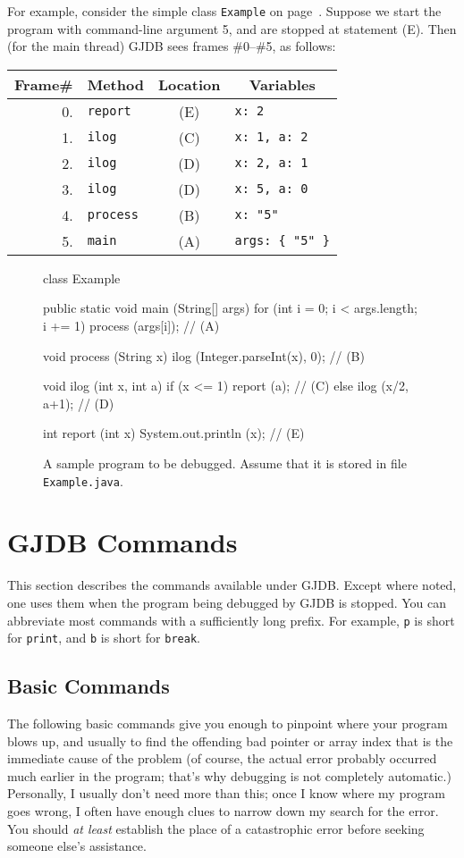 \documentclass[11pt,twoside]{handout}
\begin{document}
For example, consider the simple class {\tt Example} on page~\pageref{fig:Example}.
Suppose we start the program with command-line argument 5, and
are stopped at statement (E).  Then (for the main thread) GJDB
sees frames \#0--\#5, as follows:

\medskip
\begin{tabular}{r | l | c | l}
\multicolumn{1}{c|}{Frame\#} & 
\multicolumn{1}{c|}{Method} & 
Location &
\multicolumn{1}{c}{Variables} \\
\hline
0. & {\tt report} & (E) & {\tt x: 2} \\
1. & {\tt ilog} & (C) & {\tt x: 1, a: 2} \\
2. & {\tt ilog} & (D) & {\tt x: 2, a: 1} \\
3. & {\tt ilog} & (D) & {\tt x: 5, a: 0} \\
4. & {\tt process} & (B) & {\tt x: "5"} \\
5. & {\tt main} & (A) & \verb|args: { "5" }|
\end{tabular}


\begin{figure}[t]
\begin{program}
class Example {
  public static void main (String[] args) {
    for (int i = 0; i < args.length; i += 1)
      process (args[i]);           // (A)
  }

  void process (String x) {
    ilog (Integer.parseInt(x), 0); // (B)
  }

  void ilog (int x, int a) {
    if (x <= 1)
       report (a);	           // (C)
    else
       ilog (x/2, a+1);		   // (D)
  }

  int report (int x) {
    System.out.println (x);        // (E)
  }
}
\end{program}
\caption{A sample program to be debugged.  Assume that it is stored in
    file {\tt Example.java}.}
\label{fig:Example}
\end{figure}

\section{GJDB Commands}\label{sec:commands}
This section describes the commands available under GJDB. Except where
noted, one
uses them when the program being debugged by GJDB is stopped.
You can abbreviate
most commands with a sufficiently long prefix.  For example, {\tt p} is
short for {\tt print}, and {\tt b} is short for {\tt break}.

\subsection{Basic Commands}
The following basic commands give you enough to pinpoint where your
program blows up, and usually to find the offending bad pointer or
array index that is the immediate cause of the problem (of course, the
actual error probably occurred much earlier in the program; that's why
debugging is not completely automatic.)  Personally, I usually don't
need more than this; once I know where my program goes wrong, I often
have enough clues to narrow down my search for the error.  You should
{\it at least\/} establish the place of a catastrophic error before
seeking someone else's assistance. 
\end{document}
